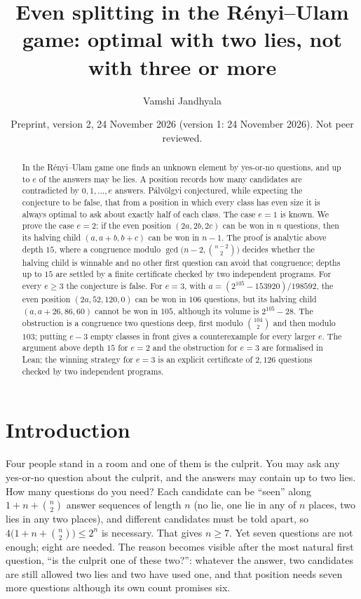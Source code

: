 \documentclass[11pt]{amsart}
\title[Even splitting with two and more lies]{Even splitting in the R\'enyi--Ulam game: optimal with two lies,
not with three or more}
\author{Vamshi Jandhyala}
\date{Preprint, version 2, 24 November 2026 (version 1: 24 November 2026). Not peer reviewed.}
\theoremstyle{definition}
\begin{document}
\begin{abstract}
In the R\'enyi--Ulam game one finds an unknown element by yes-or-no questions, and up to $e$ of the answers may be
lies. A position records how many candidates are contradicted by $0,1,\dots,e$ answers. P\'alv\"olgyi conjectured,
while expecting the conjecture to be false, that from a position in which every class has even size it is always
optimal to ask about exactly half of each class. The case $e=1$ is known. We prove the case $e=2$: if the even
position $(2a,2b,2c)$ can be won in $n$ questions, then its halving child $(a,a+b,b+c)$ can be won in $n-1$. The
proof is analytic above depth $15$, where a congruence modulo $\gcd\bigl(n-2,\binom{n-2}2\bigr)$ decides whether the halving
child is winnable and no other first question can avoid that congruence; depths up to $15$ are settled by a finite
certificate checked by two independent programs. For every $e\ge3$ the conjecture is false. For $e=3$, with
$a=(2^{105}-153920)/198592$, the even position $(2a,52,120,0)$ can be won in $106$ questions, but its halving child
$(a,a+26,86,60)$ cannot be won in $105$, although its volume is $2^{105}-28$. The obstruction is a congruence two
questions deep, first modulo $\binom{104}2$ and then modulo $103$; putting $e-3$ empty classes in front gives
a counterexample for every larger $e$. The argument above depth $15$ for $e=2$ and the
obstruction for $e=3$ are formalised in Lean; the winning strategy for $e=3$ is an explicit certificate of $2{,}126$
questions checked by two independent programs.
\end{abstract}

\maketitle

\section{Introduction}

Four people stand in a room and one of them is the culprit. You may ask any yes-or-no question about the culprit,
and the answers may contain up to two lies. How many questions do you need? Each candidate can be ``seen'' along
$1+n+\binom n2$ answer sequences of length $n$ (no lie, one lie in any of $n$ places, two lies in any two places),
and different candidates must be told apart, so $4\bigl(1+n+\binom n2\bigr)\le 2^n$ is necessary. That gives
$n\ge7$. Yet seven questions are not enough; eight are needed. The reason becomes visible after the most natural
first question, ``is the culprit one of these two?'': whatever the answer, two candidates are still allowed two lies
and two have used one, and that position needs seven more questions although its own count promises six.
\end{document}
